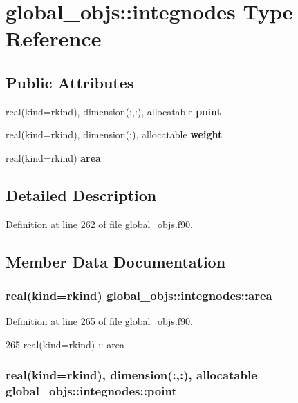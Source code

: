 \section{global\+\_\+objs\+:\+:integnodes Type Reference}
\label{structglobal__objs_1_1integnodes}
\subsection*{Public Attributes}
\begin{DoxyCompactItemize}
\item 
real(kind=rkind), dimension(\+:,\+:), allocatable {\bf point}
\item 
real(kind=rkind), dimension(\+:), allocatable {\bf weight}
\item 
real(kind=rkind) {\bf area}
\end{DoxyCompactItemize}


\subsection{Detailed Description}


Definition at line 262 of file global\+\_\+objs.\+f90.



\subsection{Member Data Documentation}
\subsubsection[{area}]{\setlength{\rightskip}{0pt plus 5cm}real(kind=rkind) global\+\_\+objs\+::integnodes\+::area}\label{structglobal__objs_1_1integnodes_ac302a260701bdfe4df1a514b7d2d47ae}


Definition at line 265 of file global\+\_\+objs.\+f90.


\begin{DoxyCode}
265     \textcolor{keywordtype}{real(kind=rkind)}                              :: area
\end{DoxyCode}
\subsubsection[{point}]{\setlength{\rightskip}{0pt plus 5cm}real(kind=rkind), dimension(\+:,\+:), allocatable global\+\_\+objs\+::integnodes\+::point}\label{structglobal__objs_1_1integnodes_a94eb8ac971e3ef11dc6eae65193374a6}


